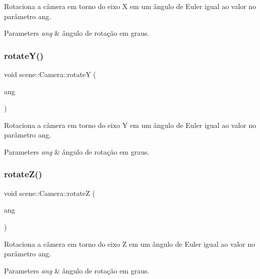 Rotaciona a câmera em torno do eixo X em um ângulo de Euler igual ao valor no parâmetro {\ttfamily ang}. 
\begin{DoxyParams}{Parameters}
{\em ang} & ângulo de rotação em graus. \\
\hline
\end{DoxyParams}
\mbox{\label{classscene_1_1_camera_aa307f8aec5276aaf1a0a642d87a22ff0}} 
\subsubsection{\texorpdfstring{rotate\+Y()}{rotateY()}}
{\footnotesize\ttfamily void scene\+::\+Camera\+::rotateY (\begin{DoxyParamCaption}\item[{G\+Lfloat}]{ang }\end{DoxyParamCaption})\hspace{0.3cm}{\ttfamily [inline]}}

Rotaciona a câmera em torno do eixo Y em um ângulo de Euler igual ao valor no parâmetro {\ttfamily ang}. 
\begin{DoxyParams}{Parameters}
{\em ang} & ângulo de rotação em graus. \\
\hline
\end{DoxyParams}
\mbox{\label{classscene_1_1_camera_a21510ead71ccba6081a174b88271a492}} 
\subsubsection{\texorpdfstring{rotate\+Z()}{rotateZ()}}
{\footnotesize\ttfamily void scene\+::\+Camera\+::rotateZ (\begin{DoxyParamCaption}\item[{G\+Lfloat}]{ang }\end{DoxyParamCaption})\hspace{0.3cm}{\ttfamily [inline]}}

Rotaciona a câmera em torno do eixo Z em um ângulo de Euler igual ao valor no parâmetro {\ttfamily ang}. 
\begin{DoxyParams}{Parameters}
{\em ang} & ângulo de rotação em graus. \\
\hline
\end{DoxyParams}
\mbox{\label{classscene_1_1_camera_a5bf781a2af68123231586bb14438c865}} 
